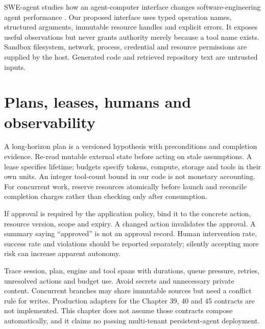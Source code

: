 SWE-agent studies how an agent-computer interface changes software-engineering
agent performance \cite{evod49:swe}. Our proposed interface uses typed
operation names, structured arguments, immutable resource handles and explicit
errors. It exposes useful observations but never grants authority merely
because a tool name exists. Sandbox filesystem, network, process, credential
and resource permissions are supplied by the host. Generated code and retrieved
repository text are untrusted inputs.


\section{Plans, leases, humans and observability}
A long-horizon plan is a versioned hypothesis with preconditions and completion
evidence. Re-read mutable external state before acting on stale assumptions.
A lease specifies lifetime; budgets specify tokens, compute, storage and tools
in their own units. An integer tool-count bound in our code is not monetary
accounting. For concurrent work, reserve resources atomically before launch and
reconcile completion charges rather than checking only after consumption.

If approval is required by the application policy, bind it to the concrete
action, resource version, scope and expiry. A changed action invalidates the
approval. A summary saying ``approved'' is not an approval record. Human
intervention rate, success rate and violations should be reported separately;
silently accepting more risk can increase apparent autonomy.

Trace session, plan, engine and tool spans with durations, queue pressure,
retries, unresolved actions and budget use. Avoid secrets and unnecessary
private content. Concurrent branches may share immutable sources but need a
conflict rule for writes. Production adapters for the Chapter 39, 40 and 45
contracts are not implemented. This chapter does not assume those contracts compose
automatically, and it claims no passing multi-tenant persistent-agent deployment.

